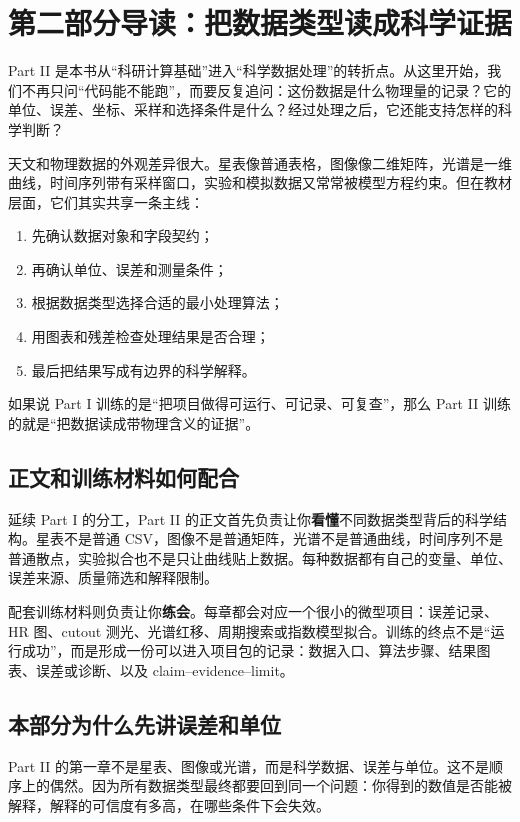 \chapter*{第二部分导读：把数据类型读成科学证据}

Part II 是本书从“科研计算基础”进入“科学数据处理”的转折点。从这里开始，我们不再只问“代码能不能跑”，而要反复追问：这份数据是什么物理量的记录？它的单位、误差、坐标、采样和选择条件是什么？经过处理之后，它还能支持怎样的科学判断？

天文和物理数据的外观差异很大。星表像普通表格，图像像二维矩阵，光谱是一维曲线，时间序列带有采样窗口，实验和模拟数据又常常被模型方程约束。但在教材层面，它们其实共享一条主线：

\begin{enumerate}
    \item 先确认数据对象和字段契约；
    \item 再确认单位、误差和测量条件；
    \item 根据数据类型选择合适的最小处理算法；
    \item 用图表和残差检查处理结果是否合理；
    \item 最后把结果写成有边界的科学解释。
\end{enumerate}

如果说 Part I 训练的是“把项目做得可运行、可记录、可复查”，那么 Part II 训练的就是“把数据读成带物理含义的证据”。

\section*{正文和训练材料如何配合}

延续 Part I 的分工，Part II 的正文首先负责让你\textbf{看懂}不同数据类型背后的科学结构。星表不是普通 CSV，图像不是普通矩阵，光谱不是普通曲线，时间序列不是普通散点，实验拟合也不是只让曲线贴上数据。每种数据都有自己的变量、单位、误差来源、质量筛选和解释限制。

配套训练材料则负责让你\textbf{练会}。每章都会对应一个很小的微型项目：误差记录、HR 图、cutout 测光、光谱红移、周期搜索或指数模型拟合。训练的终点不是“运行成功”，而是形成一份可以进入项目包的记录：数据入口、算法步骤、结果图表、误差或诊断、以及 claim--evidence--limit。

\section*{本部分为什么先讲误差和单位}

Part II 的第一章不是星表、图像或光谱，而是科学数据、误差与单位。这不是顺序上的偶然。因为所有数据类型最终都要回到同一个问题：你得到的数值是否能被解释，解释的可信度有多高，在哪些条件下会失效。

